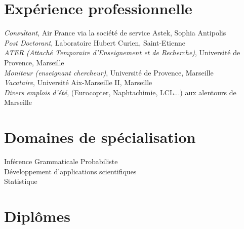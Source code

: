 


\reversemarginpar



\afficheContactInfos

\section*{Expérience professionnelle}

\noindent{}\emph{Consultant}, Air France via la société de service Astek, Sophia Antipolis\\
\emph{Post Doctorant}, Laboratoire Hubert Curien, Saint-Etienne\\
\emph{\textsc{ATER} {\footnotesize (Attaché Temporaire d'Enseignement et de Recherche)}}, Université de Provence, Marseille \\
\emph{Moniteur (enseignant \amper{} chercheur)}, Université de Provence, Marseille \\
\emph{Vacataire}, Université Aix-Marseille II, Marseille \\
\emph{Divers emplois d'été}, {\footnotesize (Eurocopter, Naphtachimie, LCL...) } aux alentours de Marseille\\

\section*{Domaines de spécialisation}
Inférence Grammaticale Probabiliste\\
Développement d'applications scientifiques\\
Statistique

\section*{Diplômes}

